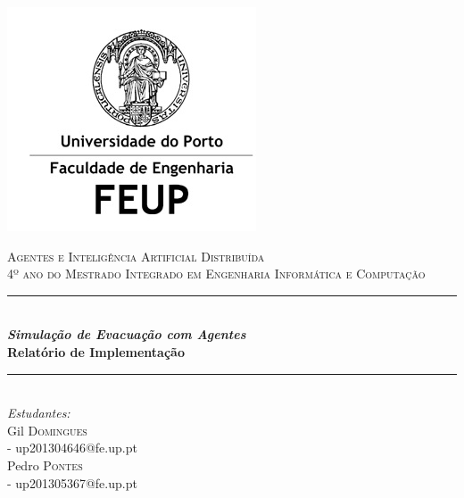 \documentclass[12pt]{article}
\begin{document}
\begin{titlepage}

\newcommand{\HRule}{\rule{\linewidth}{1mm}} %

\center %
 

\includegraphics{feup.jpg}

\textsc{\large Agentes e Inteligência Artificial Distribuída}\\[0.8cm] %
\textsc{\large 4º ano do Mestrado Integrado em Engenharia Informática e Computação}\\[0.8cm] %


\HRule \\[1.2cm]
{ \huge \bfseries \textit{Simulação de Evacuação com Agentes}}\\[0.6cm] %
{ \large \bfseries Relatório de Implementação} \\[0.6cm]
\HRule \\[2cm]
 


\Large \emph{Estudantes:}\\[0.5cm] \normalsize
Gil \textsc{Domingues}\\[0.1cm]  
- up201304646@fe.up.pt\\[0.1cm]
Pedro \textsc{Pontes}\\[0.1cm]
- up201305367@fe.up.pt\\[2cm] 


\end{titlepage}
\end{document}
